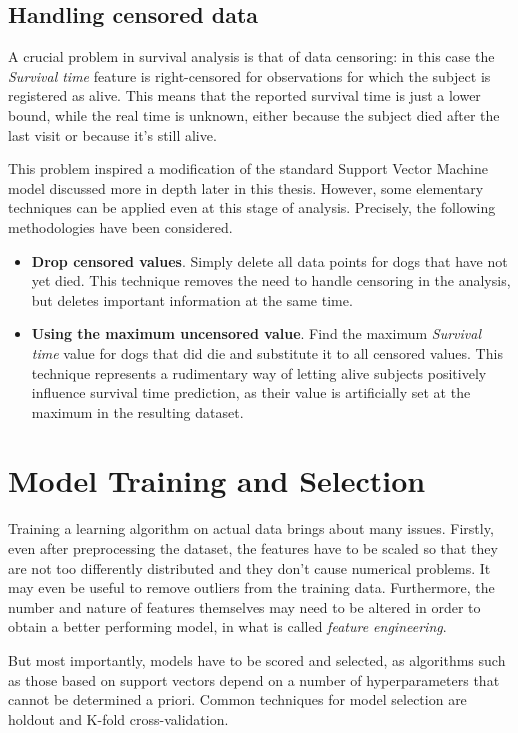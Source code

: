 \documentclass[12pt]{report}
\begin{document}
\section{Handling censored data} \label{handlcens}
A crucial problem in survival analysis is that of data censoring: in this case the \textit{Survival time} feature is right-censored for observations for which the subject is registered as alive. This means that the reported survival time is just a lower bound, while the real time is unknown, either because the subject died after the last visit or because it's still alive.

This problem inspired a modification of the standard Support Vector Machine model discussed more in depth later in this thesis. However, some elementary techniques can be applied even at this stage of analysis. Precisely, the following methodologies have been considered.
\begin{itemize}
\item \textbf{Drop censored values}. Simply delete all data points for dogs that have not yet died. This technique removes the need to handle censoring in the analysis, but deletes important information at the same time.
\item \textbf{Using the maximum uncensored value}. Find the maximum \textit{Survival time} value for dogs that did die and substitute it to all censored values. This technique represents a rudimentary way of letting alive subjects positively influence survival time prediction, as their value is artificially set at the maximum in the resulting dataset.
\end{itemize}

\chapter{Model Training and Selection}
\label{chmodsel}
Training a learning algorithm on actual data brings about many issues.
Firstly, even after preprocessing the dataset, the features have to be scaled so that they are not too differently distributed and they don't cause numerical problems. It may even be useful to remove outliers from the training data. Furthermore, the number and nature of features themselves may need to be altered in order to obtain a better performing model, in what is called \textit{feature engineering}.

But most importantly, models have to be scored and selected, as algorithms such as those based on support vectors depend on a number of hyperparameters that cannot be determined a priori. Common techniques for model selection are holdout and K-fold cross-validation.
\end{document}
